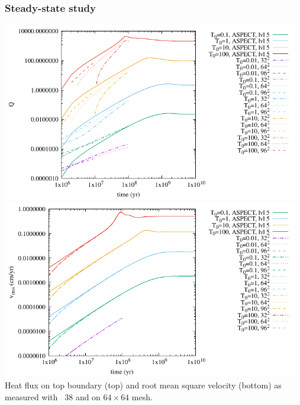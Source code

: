\subsubsection*{Steady-state study}

\begin{center}
\includegraphics[width=13cm]{python_codes/fieldstone_38/results/Q.pdf}\\
\includegraphics[width=13cm]{python_codes/fieldstone_38/results/vrms.pdf}\\
{\captionfont Heat flux on top boundary (top) and root mean square velocity (bottom)
as measured with \stone~38 and \aspect on $64\times 64$ mesh.}
\end{center}


\newpage

